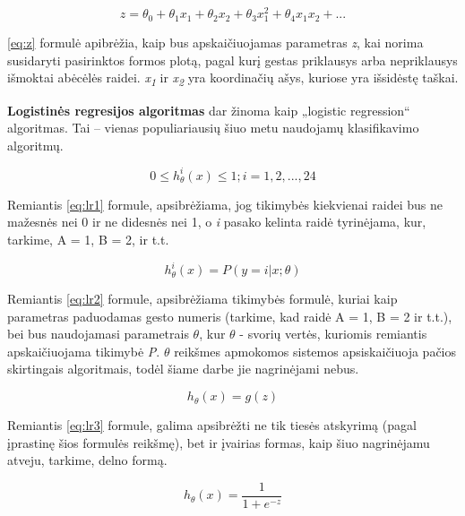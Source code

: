 \documentclass{VUMIFInfKursinis}
\begin{document}
\begin{equation}\label{eq:z}
	z = \theta_0+\theta_1x_1+\theta_2x_2+\theta_3x_1^2+\theta_4x_1x_2+...
\end{equation}

\ref{eq:z} formulė apibrėžia, kaip bus apskaičiuojamas parametras \textit{z}, kai norima susidaryti pasirinktos formos plotą, pagal kurį gestas priklausys arba nepriklausys išmoktai abėcėlės raidei. \textit{x\textsubscript{1}} ir \textit{x\textsubscript{2}} yra koordinačių ašys, kuriose yra išsidėstę taškai.


\textbf{Logistinės regresijos algoritmas} dar žinoma kaip „logistic regression“ algoritmas. Tai – vienas populiariausių šiuo metu naudojamų klasifikavimo algoritmų.

\begin{equation}\label{eq:lr1}
	0 \leq h_\theta^i(x) \leq 1; i = 1, 2, ..., 24
\end{equation}

Remiantis \ref{eq:lr1} formule, apsibrėžiama, jog tikimybės kiekvienai raidei bus ne mažesnės nei 0 ir ne didesnės nei 1, o \textit{i} pasako kelinta raidė tyrinėjama, kur, tarkime, A = 1, B = 2, ir t.t.


\begin{equation}\label{eq:lr2}
	h_\theta^i(x) = P(y=i | x; \theta)
\end{equation}

Remiantis \ref{eq:lr2} formule, apsibrėžiama tikimybės formulė, kuriai kaip parametras paduodamas gesto numeris (tarkime, kad raidė A = 1, B = 2 ir t.t.), bei bus naudojamasi parametrais $\theta$, kur  $\theta$ - svorių vertės, kuriomis remiantis apskaičiuojama tikimybė 
\textit{P}. $\theta$ reikšmes apmokomos sistemos apsiskaičiuoja pačios skirtingais algoritmais, todėl šiame darbe jie nagrinėjami nebus.

\begin{equation}\label{eq:lr3}
	h_\theta(x)= g(z)
\end{equation}


Remiantis \ref{eq:lr3} formule, galima apsibrėžti ne tik tiesės atskyrimą (pagal įprastinę šios formulės reikšmę), bet ir įvairias formas, kaip šiuo nagrinėjamu atveju, tarkime, delno formą. 

\begin{equation}\label{eq:lr4}
	h_\theta(x) = \frac{1}{1+e^{-z}}
\end{equation}
\end{document}
